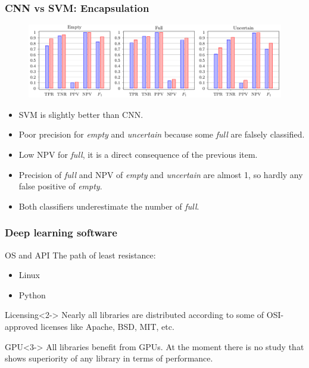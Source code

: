 \documentclass{beamer}
\begin{document}
\begin{frame}
\frametitle{CNN vs SVM: Encapsulation}

\begin{figure}
\centering
\includegraphics[width=\linewidth,height=0.8\textheight,keepaspectratio]{cnn_vs_svm_encapsulation.png} 
\end{figure}

\begin{itemize}
\item SVM is slightly better than CNN.
\item Poor precision for \textit{empty} and \textit{uncertain} because some \textit{full} are falsely classified.
\item Low NPV for \textit{full}, it is a direct consequence of the previous item.
\item Precision of \textit{full} and NPV of \textit{empty} and \textit{uncertain} are almost 1, so hardly any false positive of \textit{empty}.
\item Both classifiers underestimate the number of \textit{full}.
\end{itemize}

\end{frame}

%
%

\begin{frame}
\frametitle{Deep learning software}

\begin{block}{OS and API}
The path of least resistance:
\begin{itemize}
\item Linux
\item Python
\end{itemize}
\end{block}

\begin{block}{Licensing}<2->
Nearly all libraries are distributed according to some of OSI-approved licenses like Apache, BSD, MIT, etc.
\end{block}

\begin{block}{GPU}<3->
All libraries benefit from GPUs. At the moment there is no study that shows superiority of any library in terms of performance.
\end{block}

\end{frame}
\end{document}
